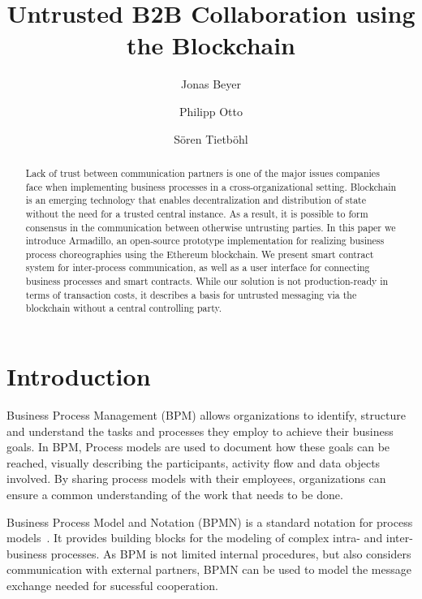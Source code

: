 \documentclass[runningheads]{llncs}
\begin{document}
%
\title{Untrusted B2B Collaboration using the Blockchain}
%
%
\author{Jonas Beyer \and Philipp Otto \and S\"oren Tietb\"ohl}
%
%
%
\maketitle %
%
\begin{abstract}
	Lack of trust between communication partners is one of the major issues companies face when implementing business processes in a cross-organizational setting.
	Blockchain is an emerging technology that enables decentralization and distribution of state without the need for a trusted central instance.
	As a result, it is possible to form consensus in the communication between otherwise untrusting parties.
	In this paper we introduce Armadillo, an open-source prototype implementation for realizing business process choreographies using the Ethereum blockchain.
	We present smart contract system for inter-process communication, as well as a user interface for connecting business processes and smart contracts.
	While our solution is not production-ready in terms of transaction costs, it describes a basis for untrusted messaging via the blockchain without a central controlling party.

\end{abstract}
%
\section{Introduction}
Business Process Management (BPM) allows organizations to identify, structure and understand the tasks and processes they employ to achieve their business goals.
In BPM, Process models are used to document how these goals can be reached, visually describing the participants, activity flow and data objects involved.
By sharing process models with their employees, organizations can ensure a common understanding of the work that needs to be done.

Business Process Model and Notation (BPMN) is a standard notation for process models~\cite{omg2014bpmn}.
It provides building blocks for the modeling of complex intra- and inter-business processes.
As BPM is not limited internal procedures, but also considers communication with external partners, BPMN can be used to model the message exchange needed for sucessful cooperation.
\end{document}
